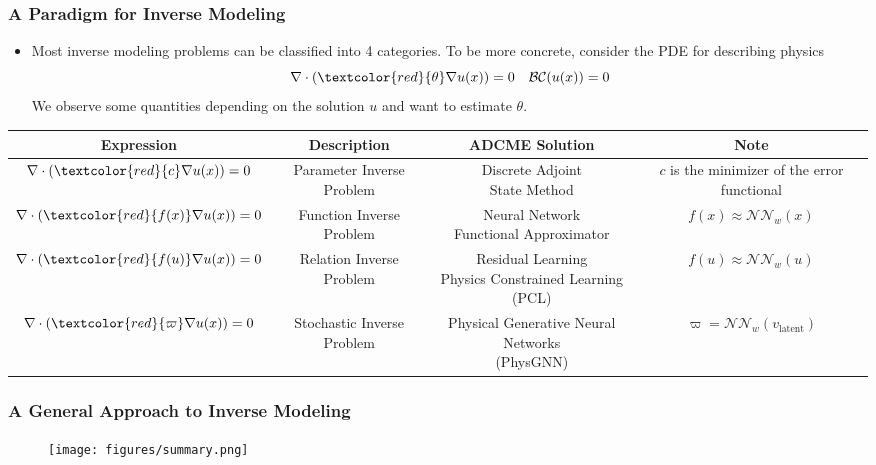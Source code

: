 \documentclass[usenames,dvipsnames]{beamer}
\begin{document}
\begin{frame}
\frametitle{A Paradigm for Inverse Modeling}
\begin{itemize}
	\item Most inverse modeling problems can be classified into 4 categories. To be more concrete, consider the PDE for describing physics
	\begin{equation}
		\nabla \cdot (\textcolor{red}{\theta} \nabla u(x)) = 0\quad \mathcal{B}\mathcal{C}(u(x)) = 0
	\end{equation}
	We observe some quantities depending on the solution $u$ and want to estimate $\theta$.
\end{itemize}
{
	\tiny
	\begin{table}[]
		\begin{tabular}{@{}cccc@{}}
			\toprule
			Expression                                       & Description                & ADCME Solution                         & Note                                     \\ \midrule
			$\nabla \cdot (\textcolor{red}{c} \nabla u(x)) = 0$ & Parameter Inverse Problem  & \makecell{Discrete Adjoint\\ State Method}          & \makecell{$c$ is the minimizer of\\ the error functional }                     \\ \hline
			$\nabla \cdot (\textcolor{red}{f(x)} \nabla u(x)) = 0$ & Function Inverse Problem & \makecell{Neural Network \\ Functional Approximator} & $f(x) \approx \mathcal{NN}_{w}(x)$             \\ \hline
			$\nabla \cdot (\textcolor{red}{f(u)} \nabla u(x)) = 0$ & Relation Inverse Problem   & \makecell{Residual Learning\\ Physics Constrained Learning (PCL)}        & $f(u) \approx \mathcal{NN}_{w}(u)$             \\ \hline
			$\nabla \cdot (\textcolor{red}{\varpi} \nabla u(x)) = 0$ & Stochastic Inverse Problem & \makecell{Physical Generative Neural Networks \\ (PhysGNN)}         & $\varpi = \mathcal{NN}_w(v_{\mathrm{latent}})$ \\ \bottomrule
		\end{tabular}
	\end{table}
}
\end{frame}


\begin{frame}
	\frametitle{A General Approach to Inverse Modeling}
	\begin{figure}[hbt]
		\texttt{[image: figures/summary.png]}
	\end{figure}
\end{frame}



\end{document}
